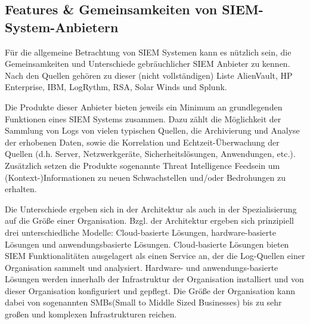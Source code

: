 \subsection{Features \&  Gemeinsamkeiten von SIEM-System-Anbietern}
Für die allgemeine Betrachtung von SIEM Systemen kann es nützlich sein, die Gemeinsamkeiten und Unterschiede gebräuchlicher SIEM Anbieter zu kennen. Nach den Quellen \citep{SIEMVendors1,SIEMVendors3,SIEMVendors4}
gehören zu dieser (nicht vollständigen) Liste AlienVault, HP Enterprise, IBM, LogRythm, RSA, Solar Winds und Splunk. 

Die Produkte dieser Anbieter bieten jeweils ein Minimum an grundlegenden Funktionen eines SIEM Systems zusammen. Dazu zählt die Möglichkeit der Sammlung von Logs von vielen typischen Quellen, die Archivierung und Analyse der erhobenen Daten, sowie die Korrelation und Echtzeit-Überwachung der Quellen (d.h. Server, Netzwerkgeräte, Sicherheitslösungen, Anwendungen, etc.). Zusätzlich setzen die Produkte sogenannte \glqq Threat Intelligence Feeds\grqq  ein um (Kontext-)Informationen zu neuen Schwachstellen und/oder Bedrohungen zu erhalten. 


Die Unterschiede ergeben sich in der Architektur als auch in der Spezialisierung auf die Größe einer Organisation. 
Bzgl. der Architektur ergeben sich prinzipiell drei unterschiedliche Modelle: Cloud-basierte Lösungen, hardware-basierte Lösungen und anwendungsbasierte Lösungen. Cloud-basierte Lösungen bieten SIEM Funktionalitäten ausgelagert als einen Service an, der die Log-Quellen einer Organisation sammelt und analysiert. Hardware- und anwendungs-basierte Lösungen werden innerhalb der Infrastruktur der Organisation installiert und von dieser Organisation konfiguriert und gepflegt. Die Größe der Organisation kann dabei von sogenannten \glqq SMBs\grqq  (Small to Middle Sized Businesses) bis zu sehr großen und komplexen Infrastrukturen reichen.

